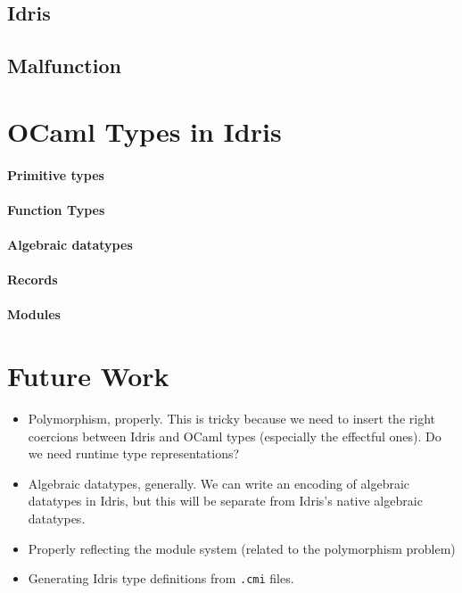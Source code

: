 \documentclass[a4paper,twocolumn]{article}
\begin{document}
\subsection{Idris}

\subsection{Malfunction}

\section{OCaml Types in Idris}

\paragraph{Primitive types}

\paragraph{Function Types}

\paragraph{Algebraic datatypes}

\paragraph{Records}

\paragraph{Modules}

\section{Future Work}

\begin{itemize}
\item Polymorphism, properly. This is tricky because we need to insert
  the right coercions between Idris and OCaml types (especially the
  effectful ones). Do we need runtime type representations?
\item Algebraic datatypes, generally. We can write an encoding of
  algebraic datatypes in Idris, but this will be separate from Idris's
  native algebraic datatypes.
\item Properly reflecting the module system (related to the
  polymorphism problem)
\item Generating Idris type definitions from \texttt{.cmi} files.
\end{itemize}
\end{document}
